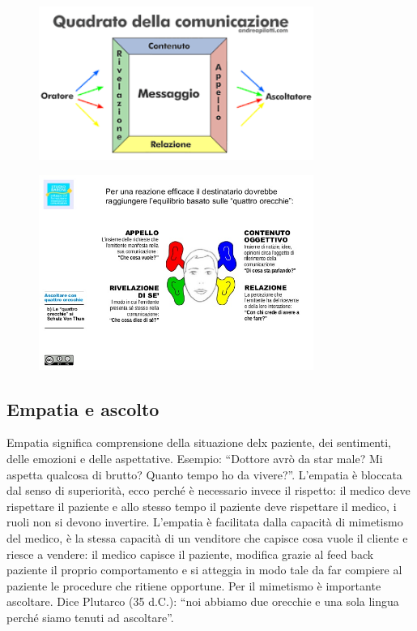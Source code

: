  \begin{figure}[!ht]
\centering
	\includegraphics[width=0.8\textwidth]{31/image1.png}
	\end{figure}

 \begin{figure}[!ht]
\centering
	\includegraphics[width=0.8\textwidth]{31/image2.jpeg}
	\end{figure}

\subsection{Empatia e ascolto}

Empatia significa comprensione della situazione delx paziente, dei
sentimenti, delle emozioni e delle aspettative. Esempio: ``Dottore avrò
da star male? Mi aspetta qualcosa di brutto? Quanto tempo ho da
vivere?''. L'empatia è bloccata dal senso di superiorità, ecco perché è
necessario invece il rispetto: il medico deve rispettare il paziente e
allo stesso tempo il paziente deve rispettare il medico, i ruoli non si
devono invertire. L'empatia è facilitata dalla capacità di mimetismo del
medico, è la stessa capacità di un venditore che capisce cosa vuole il
cliente e riesce a vendere: il medico capisce il paziente, modifica
grazie al feed back paziente il proprio comportamento e si atteggia in
modo tale da far compiere al paziente le procedure che ritiene
opportune. Per il mimetismo è importante ascoltare. Dice Plutarco (35
d.C.): ``noi abbiamo due orecchie e una sola lingua perché siamo tenuti
ad ascoltare''.


